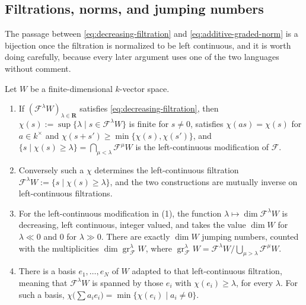 \subsection{Filtrations, norms, and jumping numbers}
\label{sec:ch33-norm-dictionary}

The passage between \eqref{eq:decreasing-filtration} and
\eqref{eq:additive-graded-norm} is a bijection once the filtration is
normalized to be left continuous, and it is worth doing carefully, because
every later argument uses one of the two languages without comment.

\begin{lemma}
\label{lem:ch33-filtration-norm-bijection}
Let $W$ be a finite-dimensional $k$-vector space.
\begin{enumerate}
\item If $(\mathcal F^\lambda W)_{\lambda\in\mathbf R}$ satisfies
 \eqref{eq:decreasing-filtration}, then
 $\chi(s):=\sup\{\lambda\mid s\in\mathcal F^\lambda W\}$ is finite for
 $s\ne0$, satisfies $\chi(as)=\chi(s)$ for $a\in k^\times$ and
 $\chi(s+s')\geq\min\{\chi(s),\chi(s')\}$, and
 $\{s\mid\chi(s)\geq\lambda\}=\bigcap_{\mu<\lambda}\mathcal F^\mu W$ is
 the left-continuous modification of $\mathcal F$.
\item Conversely such a $\chi$ determines the left-continuous filtration
 $\mathcal F^\lambda W:=\{s\mid\chi(s)\geq\lambda\}$, and the two
 constructions are mutually inverse on left-continuous filtrations.
\item For the left-continuous modification in (1), the function
 $\lambda\mapsto\dim\mathcal F^\lambda W$ is decreasing,
 left continuous, integer valued, and takes the value $\dim W$ for
 $\lambda\ll0$ and $0$ for $\lambda\gg0$.  There are exactly
 $\dim W$ jumping numbers, counted with the multiplicities
 $\dim\operatorname{gr}^\lambda_{\mathcal F}W$, where
 $\operatorname{gr}^\lambda_{\mathcal F}W
 =\mathcal F^\lambda W/\bigcup_{\mu>\lambda}\mathcal F^\mu W$.
\item There is a basis $e_1,\dots,e_N$ of $W$ adapted to
 that left-continuous filtration, meaning that $\mathcal F^\lambda W$ is spanned by those
 $e_i$ with $\chi(e_i)\geq\lambda$, for every $\lambda$.  For such a
 basis, $\chi\bigl(\sum a_ie_i\bigr)=\min\{\chi(e_i)\mid a_i\ne0\}$.
\end{enumerate}
\end{lemma}

